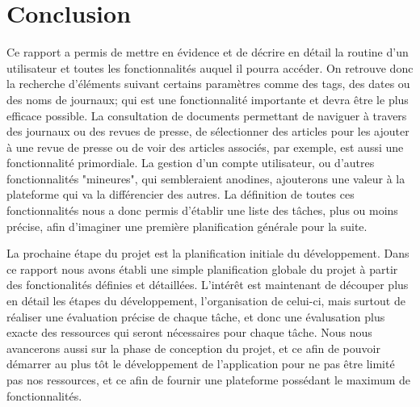 \section{Conclusion}
\label{sec:conc}

Ce rapport a permis de mettre en évidence et de décrire en détail la routine d'un utilisateur et toutes les fonctionnalités auquel il pourra accéder. On retrouve donc la recherche d'éléments suivant certains paramètres comme des tags, des dates ou des noms de journaux; qui est une fonctionnalité importante et devra être le plus efficace possible. La consultation de documents permettant de naviguer à travers des journaux ou des revues de presse, de sélectionner des articles pour les ajouter à une revue de presse ou de voir des articles associés, par exemple, est aussi une fonctionnalité primordiale. La gestion d'un compte utilisateur, ou d'autres fonctionnalités "mineures", qui sembleraient anodines, ajouterons une valeur à la plateforme qui va la différencier des autres. La définition de toutes ces fonctionnalités nous a donc permis d'établir une liste des tâches, plus ou moins précise, afin d'imaginer une première planification générale pour la suite. 

La prochaine étape du projet est la planification initiale du développement. Dans ce rapport nous avons établi une simple planification globale du projet à partir des fonctionalités définies et détaillées. L'intérêt est maintenant de découper plus en détail les étapes du développement, l'organisation de celui-ci, mais surtout de réaliser une évaluation précise de chaque tâche, et donc une évalusation plus exacte des ressources qui seront nécessaires pour chaque tâche. Nous nous avancerons aussi sur la phase de conception du projet, et ce afin de pouvoir démarrer au plus tôt le développement de l'application pour ne pas être limité pas nos ressources, et ce afin de fournir une plateforme possédant le maximum de fonctionnalités.
